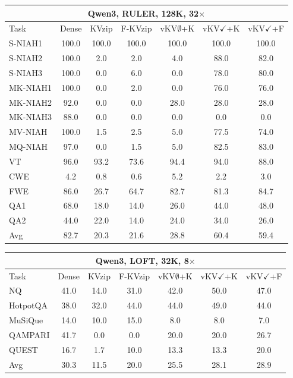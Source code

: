 \begin{tabular}{lcccccc}
\toprule
\multicolumn{7}{c}{Qwen3, RULER, 128K, 32$\times$} \\
\midrule
Task & Dense & KVzip & F-KVzip & vKV$\emptyset$+K & vKV$\checkmark$+K & vKV$\checkmark$+F \\
\midrule
S-NIAH1 & 100.0 & 100.0 & 100.0 & 100.0 & 100.0 & 100.0 \\
S-NIAH2 & 100.0 & 2.0 & 2.0 & 4.0 & 88.0 & 82.0 \\
S-NIAH3 & 100.0 & 0.0 & 6.0 & 0.0 & 78.0 & 80.0 \\
MK-NIAH1 & 100.0 & 0.0 & 2.0 & 0.0 & 76.0 & 76.0 \\
MK-NIAH2 & 92.0 & 0.0 & 0.0 & 28.0 & 28.0 & 28.0 \\
MK-NIAH3 & 88.0 & 0.0 & 0.0 & 0.0 & 0.0 & 0.0 \\
MV-NIAH & 100.0 & 1.5 & 2.5 & 5.0 & 77.5 & 74.0 \\
MQ-NIAH & 97.0 & 0.0 & 1.5 & 5.0 & 82.5 & 83.0 \\
VT & 96.0 & 93.2 & 73.6 & 94.4 & 94.0 & 88.0 \\
CWE & 4.2 & 0.8 & 0.6 & 5.2 & 2.2 & 3.0 \\
FWE & 86.0 & 26.7 & 64.7 & 82.7 & 81.3 & 84.7 \\
QA1 & 68.0 & 18.0 & 14.0 & 26.0 & 44.0 & 48.0 \\
QA2 & 44.0 & 22.0 & 14.0 & 24.0 & 34.0 & 26.0 \\
\midrule
Avg & 82.7 & 20.3 & 21.6 & 28.8 & 60.4 & 59.4 \\
\bottomrule
\end{tabular}
\vspace{0.8em}

\begin{tabular}{lcccccc}
\toprule
\multicolumn{7}{c}{Qwen3, LOFT, 32K, 8$\times$} \\
\midrule
Task & Dense & KVzip & F-KVzip & vKV$\emptyset$+K & vKV$\checkmark$+K & vKV$\checkmark$+F \\
\midrule
NQ & 41.0 & 14.0 & 31.0 & 42.0 & 50.0 & 47.0 \\
HotpotQA & 38.0 & 32.0 & 44.0 & 44.0 & 49.0 & 44.0 \\
MuSiQue & 14.0 & 10.0 & 15.0 & 8.0 & 8.0 & 7.0 \\
QAMPARI & 41.7 & 0.0 & 0.0 & 20.0 & 20.0 & 26.7 \\
QUEST & 16.7 & 1.7 & 10.0 & 13.3 & 13.3 & 20.0 \\
\midrule
Avg & 30.3 & 11.5 & 20.0 & 25.5 & 28.1 & 28.9 \\
\bottomrule
\end{tabular}
\vspace{0.8em}

